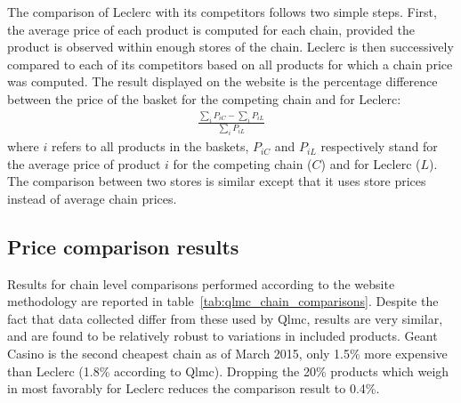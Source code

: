 \documentclass[english]{article}
\begin{document}
The comparison of Leclerc with its competitors follows two simple steps. First, the average price of each product is computed for each chain, provided the product is observed within enough stores of the chain. Leclerc is then successively compared to each of its competitors based on all products for which a chain price was computed. The result displayed on the website is the percentage difference between the price of the basket for the competing chain and for Leclerc:
\begin{align*}
\frac{\sum\limits_{i} P_{iC} - \sum\limits_{i} P_{iL}}{\sum\limits_{i} P_{iL}}
\end{align*}
where $i$ refers to all products in the baskets, $P_{iC}$ and $P_{iL}$ respectively stand for the average price of product $i$ for the competing chain ($C$) and for Leclerc ($L$). The comparison between two stores is similar except that it uses store prices instead of average chain prices.

\subsection{Price comparison results}

Results for chain level comparisons performed according to the website methodology are reported in table~\ref{tab:qlmc_chain_comparisons}. Despite the fact that data collected differ from these used by Qlmc, results are very similar, and are found to be relatively robust to variations in included products. Geant Casino is the second cheapest chain as of March 2015, only 1.5\% more expensive than Leclerc (1.8\% according to Qlmc). Dropping the 20\% products which weigh in most favorably for Leclerc reduces the comparison result to 0.4\%.
\end{document}
